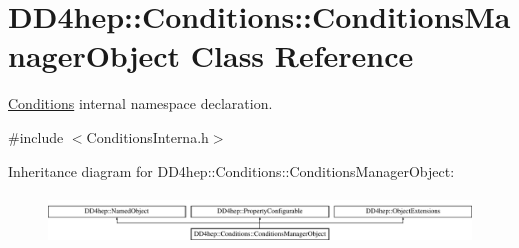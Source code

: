 \hypertarget{class_d_d4hep_1_1_conditions_1_1_conditions_manager_object}{}\section{D\+D4hep\+:\+:Conditions\+:\+:Conditions\+Manager\+Object Class Reference}
\label{class_d_d4hep_1_1_conditions_1_1_conditions_manager_object}


\hyperlink{namespace_d_d4hep_1_1_conditions}{Conditions} internal namespace declaration.  




{\ttfamily \#include $<$Conditions\+Interna.\+h$>$}

Inheritance diagram for D\+D4hep\+:\+:Conditions\+:\+:Conditions\+Manager\+Object\+:\begin{figure}[H]
\begin{center}
\leavevmode
\includegraphics[height=1.314554cm]{class_d_d4hep_1_1_conditions_1_1_conditions_manager_object}
\end{center}
\end{figure}
